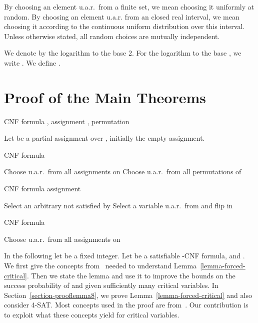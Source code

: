 By choosing an element u.a.r.\ from a finite set, we mean choosing it
uniformly at random. By choosing an element u.a.r. from an closed real
interval, we mean choosing it according to the continuous uniform
distribution over this interval. Unless otherwise stated, all random
choices are mutually independent.

We denote by  the logarithm to the base 2. For the logarithm to
the base , we write . We define .

\section{Proof of the Main Theorems}

\begin{algorithm}[t]
\caption{CNF formula , assignment , permutation }
\begin{algorithmic}
\STATE Let  be a 
partial assignment over , initially the empty assignment.
\STATE 
{}
\IF {}
\STATE 
\ELSIF {}
\STATE 
\ELSE 
\STATE 
\ENDIF
\STATE 
\ENDFOR
\RETURN 
\end{algorithmic}
\end{algorithm}
\begin{algorithm}[t]
\caption{CNF formula }
\begin{algorithmic}
  \STATE {} \STATE Choose
   u.a.r.\ from all assignments on  \STATE Choose
   u.a.r.\ from all permutations of  \RETURN
  
\end{algorithmic}
\end{algorithm}
\begin{algorithm}[t]
\caption{CNF formula  assignment }
\begin{algorithmic}
\RETURN 
\ENDIF
\STATE Select an arbitrary  not satisfied by 
\STATE Select a variable  u.a.r.\ from  and flip  in 
\ENDFOR
\RETURN 
\end{algorithmic}
\end{algorithm}
\begin{algorithm}[t]
\caption{CNF formula }
\begin{algorithmic}
\STATE
{}
\STATE Choose  u.a.r.\ from all assignments on 
\STATE 
\IF {}
\STATE 
\ENDIF
\RETURN 
\end{algorithmic}
\end{algorithm}



In the following let  be a fixed integer. Let  be a
satisfiable -CNF formula,  and . 
We first give the concepts from~\cite{ppsz} needed to understand Lemma~\ref{lemma-forced-critical}. Then we state the lemma and
use it to improve
the bounds on the success probability of  and  given sufficiently many critical variables. In Section~\ref{section-prooflemma8}, we prove Lemma~\ref{lemma-forced-critical} and also consider 4-SAT. Most concepts used in the proof are from~\cite{ppsz,rolf2006}. Our contribution is to exploit what these concepts yield for critical variables.\paragraphprev

